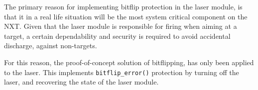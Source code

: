 The primary reason for implementing bitflip protection in the laser module, is that it in a real life situation will be the most system critical component on the NXT.
Given that the laser module is responsible for firing when aiming at a target, a certain dependability and security is required to avoid accidental discharge, against non-targets.

For this reason, the proof-of-concept solution of bitflipping, has only been applied to the laser.
This implements \texttt{bitflip\_error()} protection by turning off the laser, and recovering the state of the laser module.
